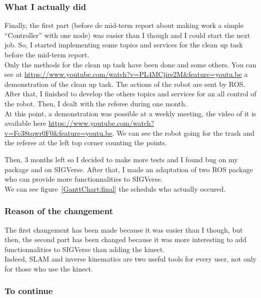 \subsubsection{What I actually did}
Finally, the first part (before de mid-term report about making work a simple ``Controller'' with one node) was easier than I though and I could start the next job. So, I started implementing some topics and services for the clean up task before the mid-term report.\\
Only the methods for the clean up task have been done and some others. You can see at \url{https://www.youtube.com/watch?v=PL4MCjire2M&feature=youtu.be} a demonstration of the clean up task. The actions of the robot are sent by ROS.\\

After that, I finished to develop the others topics and services for an all control of the robot. Then, I dealt with the referee during one month.\\
At this point, a demonstration was possible at a weekly meeting, the video of it is available here \url{https://www.youtube.com/watch?v=Fc38tqwr0F0&feature=youtu.be}. We can see the robot going for the trash and the referee at the left top corner counting the points.

Then, 3 months left so I decided to make more tests and I found bug on my package and on SIGVerse. After that, I made an adaptation of two ROS package who can provide more functionnalities to SIGVerse.\\
We can see figure~\ref{GanttChart:final} the schedule who actually occured.

\subsubsection{Reason of the changement}
The first changement has been made because it was easier than I though, but then, the second part has been changed because it was more interesting to add functionnalities to SIGVerse than adding the kinect.\\
Indeed, SLAM and inverse kinematics are two useful tools for every user, not only for those who use the kinect.

\subsubsection{To continue}

